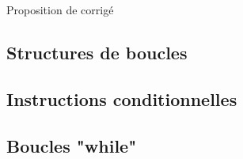 
\vspace{0.1cm}
\begin{huge}
 Proposition de corrigé
\end{huge}

\subsection{Structures de boucles}
\setcounter{thequestion}{0}
\subsection{Instructions conditionnelles}
\setcounter{thequestion}{0}
\subsection{Boucles "while"}
\setcounter{thequestion}{0}
